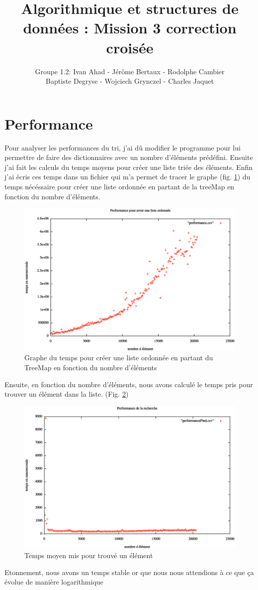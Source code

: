 \documentclass[a4paper]{article}
\title{Algorithmique et structures de données : Mission 3 correction croisée}
\author{Groupe 1.2: Ivan Ahad - Jérôme Bertaux - Rodolphe Cambier \\ 
	Baptiste Degryse - Wojciech Grynczel - Charles Jaquet}
\begin{document}
\section*{Performance}
Pour analyser les performances du tri, j'ai dû modifier le programme pour lui permettre de faire des dictionnaires avec un nombre d'éléments prédéfini. Ensuite j'ai fait les calculs du temps moyens pour créer une liste triée des éléments. Enfin j'ai écris ces temps dans un fichier qui m'a permet de tracer le graphe (fig. \ref{perfo}) du temps nécéssaire pour créer une liste ordonnée en partant de la treeMap en fonction du nombre d'éléments.


\begin{figure} [h!]
\begin{center}
\includegraphics[scale=0.4]{performanceListeOrdonnee.eps}
\caption{Graphe du temps pour créer une liste ordonnée en partant du TreeMap en fonction du nombre d'éléments}
\label{perfo}
\end{center}
\end{figure}

Ensuite, en fonction du nombre d'éléments, nous avons calculé le temps pris pour trouver un élément dans la liste. (Fig. \ref{perfoFind})

\begin{figure} [h!]
\begin{center}
\includegraphics[scale=0.4]{performanceFind.eps}
\caption{Temps moyen mis pour trouvé un élément}
\label{perfoFind}
\end{center}
\end{figure}

Etonnement, nous avons un temps stable or que nous nous attendions à ce que ça évolue de manière logarithmique
\end{document}
